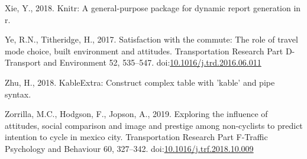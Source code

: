 \documentclass[]{elsarticle} %
\begin{document}
\leavevmode\hypertarget{ref-Xie2018}{}%
Xie, Y., 2018. Knitr: A general-purpose package for dynamic report
generation in r.

\leavevmode\hypertarget{ref-Ye2017satisfaction}{}%
Ye, R.N., Titheridge, H., 2017. Satisfaction with the commute: The role
of travel mode choice, built environment and attitudes. Transportation
Research Part D-Transport and Environment 52, 535--547.
doi:\href{https://doi.org/10.1016/j.trd.2016.06.011}{10.1016/j.trd.2016.06.011}

\leavevmode\hypertarget{ref-Zhu2018}{}%
Zhu, H., 2018. KableExtra: Construct complex table with 'kable' and pipe
syntax.

\leavevmode\hypertarget{ref-Zorrilla2019exploring}{}%
Zorrilla, M.C., Hodgson, F., Jopson, A., 2019. Exploring the influence
of attitudes, social comparison and image and prestige among
non-cyclists to predict intention to cycle in mexico city.
Transportation Research Part F-Traffic Psychology and Behaviour 60,
327--342.
doi:\href{https://doi.org/10.1016/j.trf.2018.10.009}{10.1016/j.trf.2018.10.009}
\end{document}
